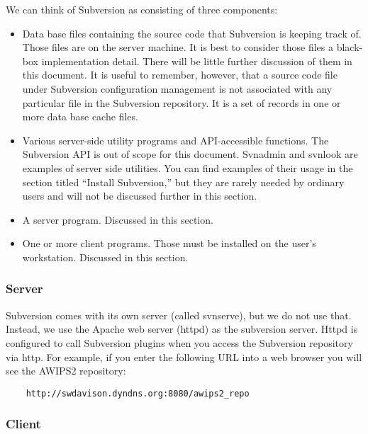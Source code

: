 We can think of Subversion as consisting of three
components:
\begin{itemize}
\item
Data base files containing the source code that Subversion is
keeping track of.  Those files are on the server machine.  It
is best to consider those files a black-box implementation 
detail.  There will be little further discussion of them in
this document.  It is useful to remember, however, that a
source code file under Subversion configuration management
is not associated with any particular file in the Subversion
repository.  It is a set of records in one or more data
base cache files.
\item
Various server-side utility programs and API-accessible
functions.  The Subversion API is out of scope for this
document.  Svnadmin and svnlook are examples of server 
side utilities.  You can find examples of their usage in
the section titled ``Install Subversion,'' but they are
rarely needed by ordinary users and will not be discussed
further in this section.
\item
A server program.  Discussed in this section.
\item
One or more client programs.  Those must be installed on
the user's workstation.  Discussed in this section.
\end{itemize}


\subsubsection{Server}

Subversion comes with its own server (called svnserve),
but we do not use that.  Instead, we use the Apache web
server (httpd) as the subversion server. Httpd is
configured to call Subversion plugins when you access the
Subversion repository via http.  For example, if you enter
the following URL into a web browser you will see the
AWIPS2 repository:
\begin{verbatim}
    http://swdavison.dyndns.org:8080/awips2_repo
\end{verbatim}


\subsubsection{Client}


